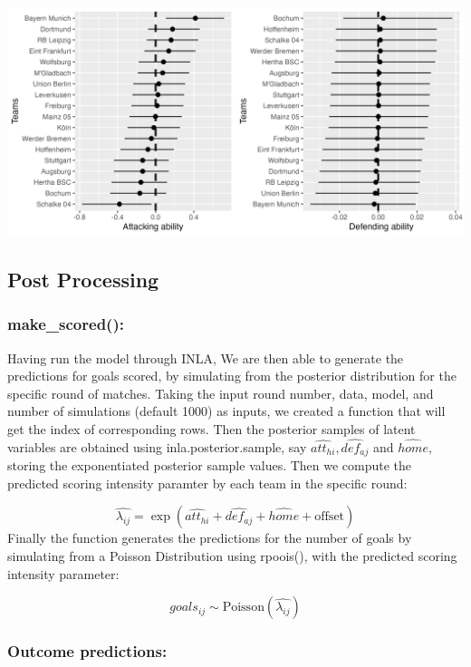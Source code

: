 \documentclass[
]{article}
\begin{document}
\includegraphics[width=33.33in]{buliattdef}

\hypertarget{post-processing}{%
\subsection{Post Processing}\label{post-processing}}

\hypertarget{make_scored}{%
\subsubsection{make\_scored():}\label{make_scored}}

Having run the model through INLA, We are then able to generate the
predictions for goals scored, by simulating from the posterior
distribution for the specific round of matches. Taking the input round
number, data, model, and number of simulations (default 1000) as inputs,
we created a function that will get the index of corresponding rows.
Then the posterior samples of latent variables are obtained using
inla.posterior.sample, say \(\hat{att_{hi}},\hat{def_{aj}}\) and
\(\hat{home}\), storing the exponentiated posterior sample values. Then
we compute the predicted scoring intensity paramter by each team in the
specific round:

\[\hat{\lambda_{ij}} = \exp(\hat{att_{hi}} + \hat{def_{aj}} + \hat{home} + \text{offset})\]
Finally the function generates the predictions for the number of goals
by simulating from a Poisson Distribution using rpoois(), with the
predicted scoring intensity parameter:

\[goals_{ij} \sim  \text{Poisson} ( \hat{\lambda_{ij}} )\]

\hypertarget{outcome-predictions}{%
\subsubsection{Outcome predictions:}\label{outcome-predictions}}
\end{document}
